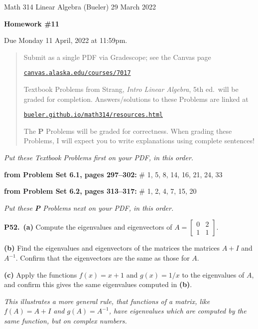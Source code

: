 \documentclass[12pt]{amsart}
\newcommand{\ds}{\displaystyle}
\newcommand{\prob}[1]{\bigskip\noindent\textbf{#1.}\quad }
\newcommand{\probset}[2]{\bigskip\noindent\textbf{from Problem Set #1, pages #2:}\quad }
\newcommand{\epart}[1]{\medskip\noindent\textbf{(#1)}\quad }
\newcommand{\ppart}[1]{\,\textbf{(#1)}\quad }
\begin{document}
\scriptsize \noindent Math 314 Linear Algebra (Bueler) \hfill 29 March 2022
\normalsize\medskip

\Large
\centerline{\textbf{Homework \#11}}

\bigskip
\large
\centerline{Due Monday 11 April, 2022 at 11:59pm.}

\normalsize
\bigskip
\begin{quote}
\medskip
\noindent Submit as a single PDF via Gradescope; see the Canvas page

\href{https://canvas.alaska.edu/courses/7017}{\texttt{canvas.alaska.edu/courses/7017}}

\noindent Textbook Problems from Strang, \emph{Intro Linear Algebra}, 5th ed.~will be graded for completion.  Answers/solutions to these Problems are linked at

\href{https://bueler.github.io/math314/resources.html}{\texttt{bueler.github.io/math314/resources.html}}

\noindent The \textbf{P} Problems will be graded for correctness.  When grading these Problems, I will expect you to write explanations using complete sentences!
\end{quote}
\medskip

\thispagestyle{empty}

\noindent \hrulefill

\noindent \emph{Put these Textbook Problems first on your PDF, in this order.}

\probset{6.1}{297--302} \# 1, 5, 8, 14, 16, 21, 24, 33

\probset{6.2}{313--317} \# 1, 2, 4, 7, 15, 20

\bigskip
\noindent \hrulefill

\noindent \emph{Put these \textbf{P} Problems next on your PDF, in this order.}

\prob{P52}  \ppart{a}  Compute the eigenvalues and eigenvectors of $\ds A = \begin{bmatrix} 0 & 2 \\ 1 & 1 \end{bmatrix}$.

\epart{b}  Find the eigenvalues and eigenvectors of the matrices the matrices $A+I$ and $A^{-1}$.  Confirm that the eigenvectors are the same as those for $A$.

\epart{c}  Apply the functions $f(x) = x+1$ and $g(x) = 1/x$ to the eigenvalues of $A$, and confirm this gives the same eigenvalues computed in \textbf{(b)}.

\medskip
\noindent \emph{This illustrates a more general rule, that functions of a matrix, like $f(A)=A+I$ and $g(A)=A^{-1}$, have eigenvalues which are computed by the same function, but on complex numbers.}
\end{document}

